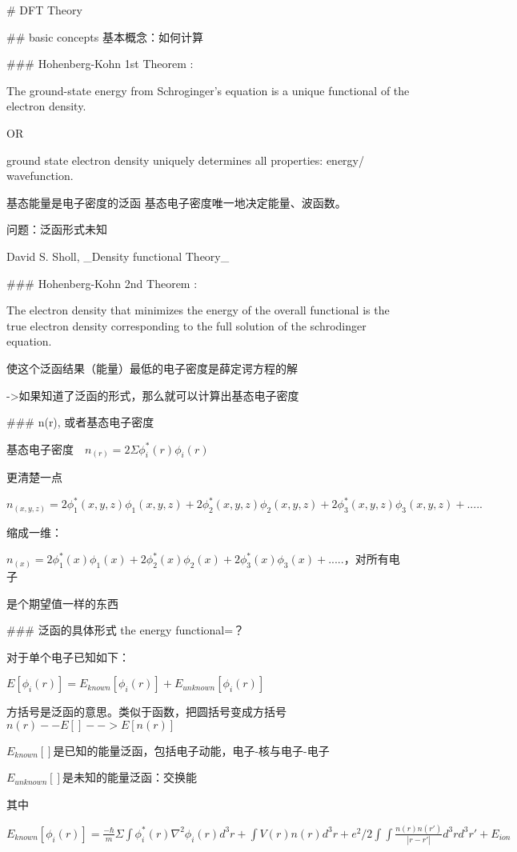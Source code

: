 \documentclass{article}
\begin{document}
# DFT Theory

## basic concepts 基本概念：如何计算

### Hohenberg-Kohn 1st Theorem :

The ground-state energy from Schroginger's equation is a unique functional of the electron density.

OR

ground state electron density uniquely determines all properties: energy/ wavefunction.

基态能量是电子密度的泛函
基态电子密度唯一地决定能量、波函数。

问题：泛函形式未知

David S. Sholl, _Density functional Theory_

### Hohenberg-Kohn 2nd Theorem :

The electron density that minimizes the energy of the overall functional is the true electron density corresponding to the full solution of the schrodinger equation.

使这个泛函结果（能量）最低的电子密度是薛定谔方程的解

->如果知道了泛函的形式，那么就可以计算出基态电子密度

### n(r), 或者基态电子密度

基态电子密度　$n_{(r)} = 2\Sigma \phi_i^*(r)\phi_i(r)$

更清楚一点

$n_{(x,y,z)} = 2\phi_1^*(x,y,z)\phi_1(x,y,z)+2\phi_2^*(x,y,z)\phi_2(x,y,z)+2\phi_3^*(x,y,z)\phi_3(x,y,z)+.....$

缩成一维：

$n_{(x)} = 2\phi_1^*(x)\phi_1(x)+2\phi_2^*(x)\phi_2(x)+2\phi_3^*(x)\phi_3(x)+.....$，对所有电子

是个期望值一样的东西

### 泛函的具体形式 the energy functional=？

对于单个电子已知如下：

$E[\phi_i(r)]=E_{known}[\phi_i(r)]+E_{unknown}[\phi_i(r)]$

方括号是泛函的意思。类似于函数，把圆括号变成方括号
$ n(r) -- E[] --> E[n(r)] $


$E_{known}[]$是已知的能量泛函，包括电子动能，电子-核与电子-电子

$E_{unknown}[]$是未知的能量泛函：交换能


其中

$E_{known}[\phi_i(r)]=\frac{-\hbar}{m}\Sigma\int\phi_i^*(r)\nabla^2\phi_i(r)d^3r+\int V(r)n(r)d^3r+e^2/2\int \int \frac {n(r)n(r')}{|r-r'|}d^3rd^3r'+E_{ion} $
\end{document}
